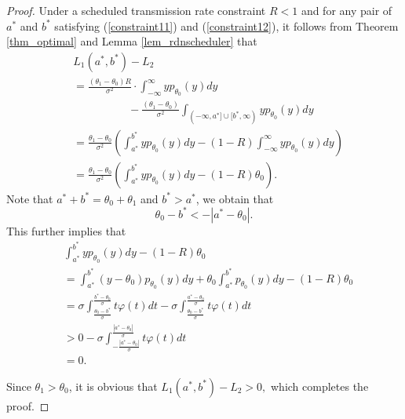 \documentclass[journal]{IEEEtran}
\begin{document}
\begin{proof}
Under a scheduled transmission rate constraint $R<1$ and for any pair of $a^{*}$ and $b^{*}$ satisfying (\ref{constraint11}) and (\ref{constraint12}), it follows from Theorem \ref{thm_optimal} and Lemma \ref{lem_rdnscheduler} that
\begin{equation*}
\begin{split}
&L_{1}({a^*},{b^*}) - L_{2}\\
&= \frac{{({\theta _1} - {\theta _0})R}}{{{\sigma ^2}}} \cdot \int_{ - \infty }^\infty  {y{p_{{\theta _0}}}(y)dy} \\
&\quad\quad\quad\quad\quad- \frac{{({\theta _1} - {\theta _0})}}{{{\sigma ^2}}}\int_{ ( - \infty ,{a^*}] \cup [{b^*},\infty )}^{} {y{p_{{\theta _0}}}(y)} dy\\
& = \frac{{{\theta _1} - {\theta _0}}}{{{\sigma ^2}}}\left( {\int_{ a^* }^{b^*}  {y{p_{{\theta _0}}}(y)dy}  - (1 - R)\int_{ - \infty }^\infty  {y{p_{{\theta _0}}}(y)dy} } \right)\\
&= \frac{{{\theta _1} - {\theta _0}}}{{{\sigma ^2}}}\left( {\int_{a^{*}}^{b^{*}} {y{p_{{\theta _0}}}(y)dy}  - (1 - R){\theta _0}} \right).
\end{split}
\end{equation*}
Note that $a^*+b^*=\theta_0+\theta_1$ and $b^{*}>a^{*}$, we obtain that
\begin{equation*}
\theta_{0}-b^{*}<-|a^{*}-\theta_{0}|.
\end{equation*}
This further implies that
 \begin{equation*}
\begin{split}
&\int_{{a^*}}^{{b^*}} {y{p_{{\theta _0}}}(y)dy}  - (1 - R){\theta _0}\\
&= \int_{{a^*}}^{{b^*}} {(y - {\theta _0}){p_{{\theta _0}}}(y)dy}  + {\theta _0}\int_{{a^*}}^{{b^*}} {{p_{{\theta _0}}}(y)dy}  - (1 - R){\theta _0}\\
&=\sigma \int_{\frac{{{\theta _0} - {b^*}}}{\sigma }}^{\frac{{{b^*} - {\theta _0}}}{\sigma }} {t\varphi (t)dt}  - \sigma \int_{\frac{{{\theta _0} - {b^*}}}{\sigma }}^{\frac{{{a^*} - {\theta _0}}}{\sigma }} {t\varphi (t)dt}\\
& > 0 - \sigma \int_{ - \frac{{|{a^*} - {\theta _0}|}}{\sigma }}^{\frac{{|{a^*} - {\theta _0}|}}{\sigma }} {t\varphi (t)dt}  \\
&= 0.
\end{split}
\end{equation*}

Since $\theta_1>\theta_0$, it is obvious that
$
L_1({a^*},{b^*}) - L_2 >0,
$
which completes the proof. \end{proof}
\end{document}
